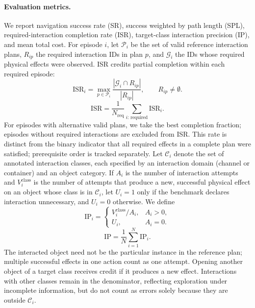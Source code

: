 
\paragraph{Evaluation metrics.}
We report navigation success rate (SR), success weighted by path length (SPL),
required-interaction completion rate (ISR), target-class interaction precision
(IP), and mean total cost. For episode $i$, let $\mathcal P_i$ be the set of
valid reference interaction plans, $R_{ip}$ the required interaction IDs in
plan $p$, and $\mathcal G_i$ the IDs whose required physical effects were
observed. ISR credits partial completion within each required episode:
\begin{equation}
\mathrm{ISR}_i = \max_{p\in\mathcal P_i}
  \frac{|\mathcal G_i\cap R_{ip}|}{|R_{ip}|},
\qquad R_{ip}\neq\emptyset.
\end{equation}
\begin{equation}
\mathrm{ISR}=\frac{1}{N_{\mathrm{req}}}
  \sum_{i:\,\mathrm{required}}\mathrm{ISR}_i.
\end{equation}
For episodes with alternative valid plans, we take the best completion
fraction; episodes without required interactions are excluded from ISR. This
rate is distinct from the binary indicator that all required effects in
a complete plan were satisfied; prerequisite order is tracked separately. Let $\mathcal C_i$ denote
the set of annotated interaction classes, each specified by an interaction
domain (channel or container) and an object category. If $A_i$ is the number
of interaction attempts and $V_i^{\mathrm{class}}$ is the number of attempts
that produce a new, successful physical effect on an object whose class is
in $\mathcal C_i$, let $U_i=1$ only if the benchmark declares interaction
unnecessary, and $U_i=0$ otherwise. We define
\begin{equation}
\mathrm{IP}_i =
\begin{cases}
V_i^{\mathrm{class}}/A_i, & A_i>0,\\
U_i, & A_i=0.
\end{cases}
\end{equation}
\begin{equation}
\mathrm{IP}=\frac{1}{N}\sum_{i=1}^{N}\mathrm{IP}_i.
\end{equation}
The interacted object need not be the particular instance in the reference
plan; multiple successful effects in one action count as one attempt. Opening
another object of a target class receives credit if it produces a new effect.
Interactions with other classes remain in the denominator, reflecting
exploration under incomplete information, but do not count as errors solely
because they are outside $\mathcal C_i$.

